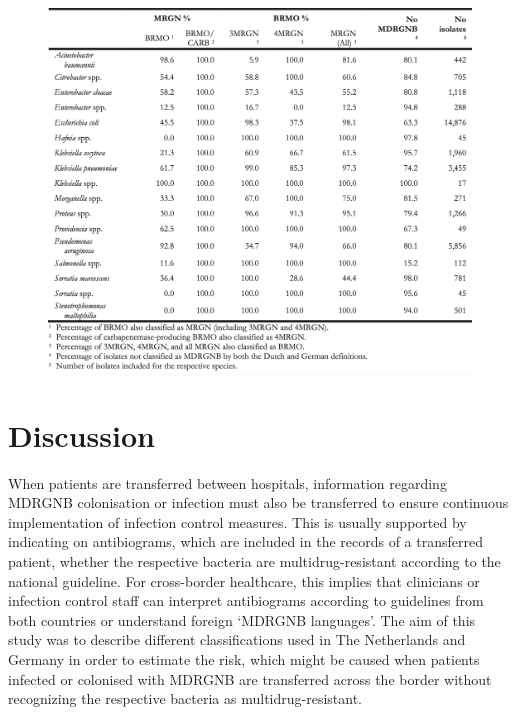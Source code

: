\documentclass[
]{book}
\begin{document}
\begin{figure}

{\centering \includegraphics[width=1\linewidth]{images/08-t04} 

}

\end{figure}

\hypertarget{discussion-4}{%
\section{Discussion}\label{discussion-4}}

When patients are transferred between hospitals, information regarding MDRGNB colonisation or infection must also be transferred to ensure continuous implementation of infection control measures. This is usually supported by indicating on antibiograms, which are included in the records of a transferred patient, whether the respective bacteria are multidrug-resistant according to the national guideline. For cross-border healthcare, this implies that clinicians or infection control staff can interpret antibiograms according to guidelines from both countries or understand foreign `MDRGNB languages'. The aim of this study was to describe different classifications used in The Netherlands and Germany in order to estimate the risk, which might be caused when patients infected or colonised with MDRGNB are transferred across the border without recognizing the respective bacteria as multidrug-resistant.
\end{document}
